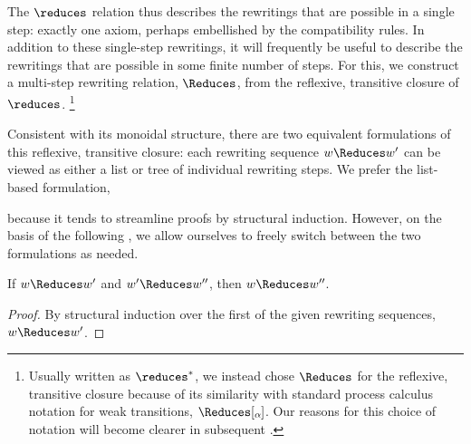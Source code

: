 
The $\reduces$ relation thus describes the rewritings that are possible in a single step: exactly one axiom, perhaps embellished by the compatibility rules.
In addition to these single-step rewritings, it will frequently be useful to describe the rewritings that are possible in some finite number of steps.
For this, we construct a multi-step rewriting relation, $\Reduces$, from the reflexive, transitive closure of $\reduces$.%
\footnote{Usually written as $\reduces^*$, we instead chose $\Reduces$ for the reflexive, transitive closure because of its similarity with standard process calculus notation for weak transitions, $\Reduces[\smash{\raisebox{-0.25ex}{$\scriptstyle\alpha$}}]$.
  Our reasons for this choice of notation will become clearer in subsequent .}

Consistent with its monoidal structure, there are two equivalent formulations of this reflexive, transitive closure: each rewriting sequence $w \Reduces w'$ can be viewed as either a list or tree of individual rewriting steps.
We prefer the list-based formulation,
because it tends to streamline proofs by structural induction.
However, on the basis of the following , we allow ourselves to freely switch between the two formulations as needed.
\begin{lemma}\label{lem:string-rewriting:trace-transitivity}
  If $w \Reduces w'$ and $w' \Reduces w''$, then $w \Reduces w''$.
\end{lemma}
\begin{proof}
  By structural induction over the first of the given rewriting sequences, $w \Reduces w'$.
\end{proof}



